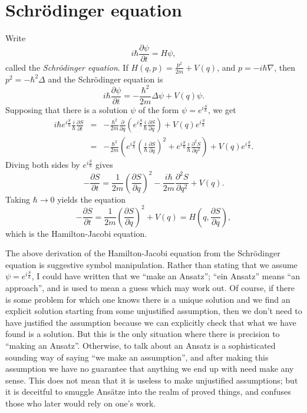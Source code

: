 \documentclass{article}
\theoremstyle{definition}
\begin{document}
\section{Schr\"odinger equation}
Write 
\[
i\hbar \frac{\partial \psi}{\partial t}=H\psi,
\]
called the {\em Schr\"odinger equation}. 
If $H(q,p)=\frac{p^2}{2m}+V(q)$, and $p=-i\hbar \nabla$, then $p^2=- \hbar^2 \Delta$  and the Schr\"odinger equation is
\[
i\hbar \frac{\partial \psi}{\partial t} = -\frac{\hbar^2}{2m} \Delta \psi + V(q)\psi.
\]
Supposing that there is a solution $\psi$ of the form $\psi=e^{i\frac{S}{\hbar}}$, we get
\begin{eqnarray*}
i\hbar e^{i\frac{S}{\hbar}}  \frac{i}{\hbar} \frac{\partial S}{\partial t}&=&-\frac{\hbar^2}{2m} \frac{\partial}{\partial q} \left(e^{i\frac{S}{\hbar}} \frac{i}{\hbar}
\frac{\partial S}{\partial q} \right)+V(q)e^{i\frac{S}{\hbar}}\\
&=&-\frac{\hbar^2}{2m}  \left( e^{i\frac{S}{\hbar}} \left(\frac{i}{\hbar}
\frac{\partial S}{\partial q}  \right)^2 + e^{i\frac{S}{\hbar}} \frac{i}{\hbar} \frac{\partial^2 S}{\partial q^2} \right)+V(q)e^{i\frac{S}{\hbar}}.
\end{eqnarray*}
Diving both sides by $e^{i\frac{S}{\hbar}}$ gives
\[
- \frac{\partial S}{\partial t} = \frac{1}{2m} \left( \frac{\partial S}{\partial q} \right)^2 -\frac{i\hbar}{2m} \frac{\partial^2 S}{\partial q^2}
+V(q).
\]
Taking $\hbar \to 0$ yields the equation
\[
-\frac{\partial S}{\partial t} = \frac{1}{2m}\left( \frac{\partial S}{\partial q}\right)^2 + V(q) = H\left(q,\frac{\partial S}{\partial q}\right),
\]
which is the Hamilton-Jacobi equation.

The above derivation of the Hamilton-Jacobi equation from the Schr\"odinger equation is suggestive symbol manipulation. Rather than stating that we assume  $\psi=e^{i\frac{S}{\hbar}}$,
I could have written that we ``make an Ansatz''; ``ein Ansatz'' means ``an approach'', and is used to mean a guess which may work out.
Of course, if there is some problem for which one knows there is a unique solution and we find an explicit solution starting from some unjustified assumption,
then we don't need to have justified the assumption because we can explicitly check that what we have found is a solution. But this is the only situation where there is precision
to ``making an Ansatz''. Otherwise, to talk about an Ansatz is a sophisticated sounding way of saying  ``we make an assumption'', and after making this assumption
we have no guarantee that anything we end up with need make any sense. This does not mean that it is useless to make unjustified assumptions; but it is
deceitful to smuggle Ans\"atze into the realm of proved things, and confuses those who later would rely on one's work. 
\end{document}
